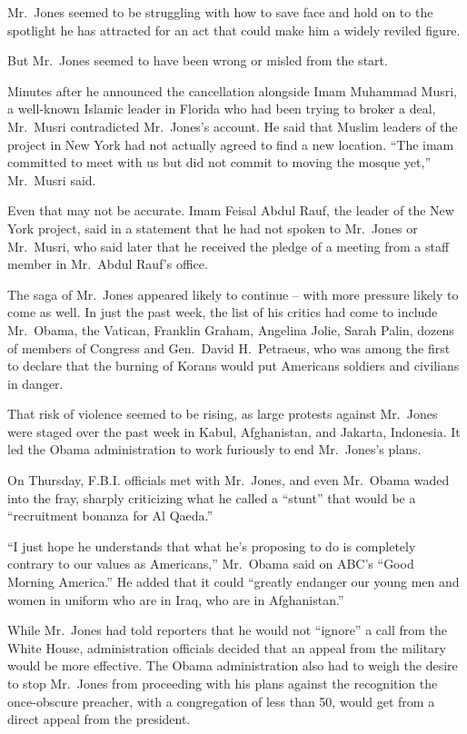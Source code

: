 ﻿\documentclass[12pt]{article}
\begin{document}
Mr.~Jones seemed to be struggling with how to save face and hold on to the spotlight he has
attracted for an act that could make him a widely reviled figure.

But Mr.~Jones seemed to have been wrong or misled from the start.

Minutes after he announced the cancellation alongside Imam Muhammad Musri, a well-known Islamic
leader in Florida who had been trying to broker a deal, Mr.~Musri contradicted Mr.~Jones's account.
He said that Muslim leaders of the project in New York had not actually agreed to find a new
location. ``The imam committed to meet with us but did not commit to moving the mosque yet,''
Mr.~Musri said.

Even that may not be accurate. Imam Feisal Abdul Rauf, the leader of the New York project, said in a
statement that he had not spoken to Mr.~Jones or Mr.~Musri, who said later that he received the
pledge of a meeting from a staff member in Mr.~Abdul Rauf's office.

The saga of Mr.~Jones appeared likely to continue -- with more pressure likely to come as well. In
just the past week, the list of his critics had come to include Mr.~Obama, the Vatican, Franklin
Graham, Angelina Jolie, Sarah Palin, dozens of members of Congress and Gen.~David H.~Petraeus, who
was among the first to declare that the burning of Korans would put Americans soldiers and civilians
in danger.

That risk of violence seemed to be rising, as large protests against Mr.~Jones were staged over the
past week in Kabul, Afghanistan, and Jakarta, Indonesia. It led the Obama administration to work
furiously to end Mr.~Jones's plans.

On Thursday, F.B.I. officials met with Mr.~Jones, and even Mr.~Obama waded into the fray, sharply
criticizing what he called a ``stunt'' that would be a ``recruitment bonanza for Al Qaeda.''

``I just hope he understands that what he's proposing to do is completely contrary to our values as
Americans,'' Mr.~Obama said on ABC's ``Good Morning America.'' He added that it could ``greatly
endanger our young men and women in uniform who are in Iraq, who are in Afghanistan.''

While Mr.~Jones had told reporters that he would not ``ignore'' a call from the White House,
administration officials decided that an appeal from the military would be more effective. The Obama
administration also had to weigh the desire to stop Mr.~Jones from proceeding with his plans against
the recognition the once-obscure preacher, with a congregation of less than 50, would get from a
direct appeal from the president.
\end{document}
